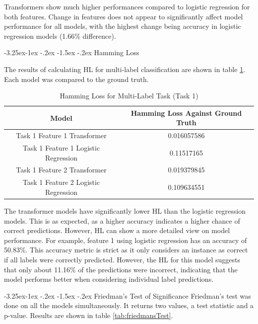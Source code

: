 \documentclass[10.7pt, onecolumn]{article}
\makeatletter
\renewcommand\subsubsection{\@startsection{subsubsection}{3}{\z@}%
	{-3.25ex\@plus -1ex \@minus -.2ex}%
    {-1.5ex \@plus -.2ex}%
    {\normalfont\itshape}}
\makeatother
\begin{document}
Transformers show much higher performances compared to logistic regression for both features. Change in features does not appear to significantly affect model performance for all models, with the highest change being accuracy in logistic regression models (1.66\% difference).

\subsubsection{Hamming Loss}

The results of calculating HL for multi-label classification are shown in table \ref{tab:hammingL}. Each model was compared to the ground truth.

\begin{table}[h!]
  \centering
  \small
  \begin{tabular}{|c|c|}
      \hline
      \textbf{Model} & \textbf{Hamming Loss Against Ground Truth} \\ \hline
      Task 1 Feature 1 Transformer & 0.016057586 \\ \hline
      Task 1 Feature 1 Logistic Regression      & 0.11517165  \\ \hline
      Task 1 Feature 2 Transformer & 0.019379845 \\ \hline
      Task 1 Feature 2 Logistic Regression      & 0.109634551 \\ \hline
  \end{tabular}
  \caption{Hamming Loss for Multi-Label Task (Task 1)}
  \label{tab:hammingL}
\end{table}

The transformer models have significantly lower HL than the logistic regression models. This is as expected, as a higher accuracy indicates a higher chance of correct predictions. However, HL can show a more detailed view on model performance. For example, feature 1 using logistic regression has an accuracy of 50.83\%. This accuracy metric is strict as it only considers an instance as correct if all labels were correctly predicted. However, the HL for this model suggests that only about 11.16\% of the predictions were incorrect, indicating that the model performs better when considering individual label predictions.

\subsubsection{Friedman's Test of Significance}
Friedman's test was done on all the models simultaneously. It returns two values, a test statistic and a p-value. Results are shown in table \ref{tab:friedmansTest}.
\end{document}
